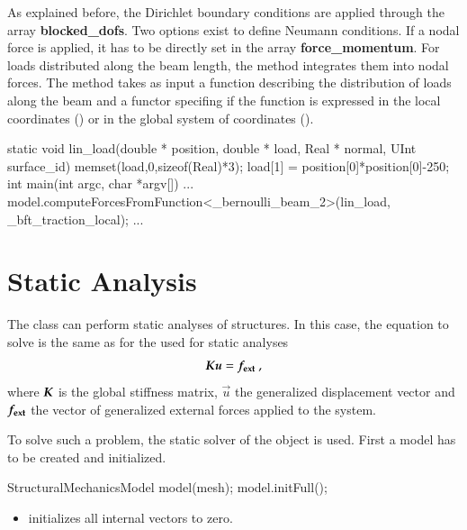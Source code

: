 As explained before, the Dirichlet boundary conditions are applied through the
array \textbf{blocked\_dofs}. Two options exist to define Neumann conditions.
If a nodal force is applied, it has to be directly set in the array
\textbf{force\_momentum}. For loads distributed along the beam length, the
method  integrates them into nodal forces.  The
method takes as input a function describing the distribution of loads along the
beam and a functor  specifing if the function is
expressed in the local coordinates () or in the
global system of coordinates ().
\begin{cpp}
 static void lin_load(double * position, double * load,
		      Real * normal, UInt surface_id){
  memset(load,0,sizeof(Real)*3);
  load[1] = position[0]*position[0]-250;
}
int main(int argc, char *argv[]){
...
model.computeForcesFromFunction<_bernoulli_beam_2>(lin_load,
                                                   _bft_traction_local);
...}
\end{cpp}


\section{Static Analysis\label{sect:structMechMod:static}}

The  class can perform static analyses
of structures.  In this case, the equation to solve is the same as for
the  used for static analyses
\begin{equation}\label{eqn:structMechMod:static}
  \boldsymbol{K} \boldsymbol{u} = \boldsymbol{f_{{\mathrm{ext}}}}~,
\end{equation}
where $\boldsymbol{K}$ is the global stiffness matrix, $\vec{u}$ the
generalized displacement vector and $\boldsymbol{f_{{\mathrm{ext}}}}$ the vector of
generalized external forces applied to the system.

To solve such a problem, the static solver of the
 object
is used.  First a model has to be created and initialized.

\begin{cpp}
  StructuralMechanicsModel model(mesh);
  model.initFull();
\end{cpp}


\begin{itemize}
\item {} initializes all internal vectors to zero.
\end{itemize}


